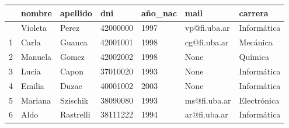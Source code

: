 \documentclass[
  letterpaper,
  DIV=11,
  numbers=noendperiod]{scrreprt}
\begin{document}
\begin{longtable}[]{@{}lllllll@{}}
\toprule\noalign{}
& nombre & apellido & dni & año\_nac & mail & carrera \\
\midrule\noalign{}
\endhead
\bottomrule\noalign{}
\endlastfoot
0 & Violeta & Perez & 42000000 & 1997 & vp@fi.uba.ar & Informática \\
1 & Carla & Guanca & 42001001 & 1998 & cg@fi.uba.ar & Mecánica \\
2 & Manuela & Gomez & 42002002 & 1998 & None & Química \\
3 & Lucia & Capon & 37010020 & 1993 & None & Informática \\
4 & Emilia & Duzac & 40001002 & 2003 & None & Informática \\
5 & Mariana & Szischik & 38090080 & 1993 & ms@fi.uba.ar & Electrónica \\
6 & Aldo & Rastrelli & 38111222 & 1994 & ar@fi.uba.ar & Informática \\
\end{longtable}
\end{document}
